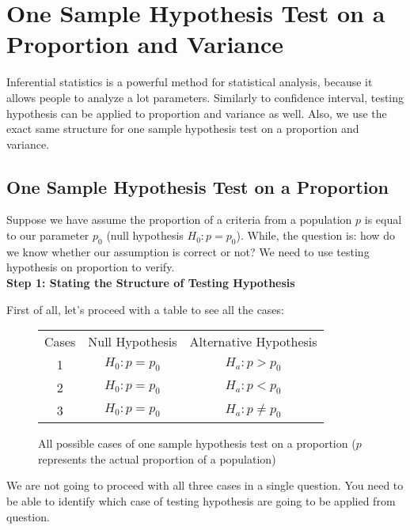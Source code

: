 \setcounter{chapter}{11}
\chapter{One Sample Hypothesis Test on a Proportion and Variance}

Inferential statistics is a powerful method for statistical analysis, because it allows people to analyze a lot parameters. Similarly to confidence interval, testing hypothesis can be applied to proportion and variance as well. Also, we use the exact same structure for one sample hypothesis test on a proportion and variance.

\section{One Sample Hypothesis Test on a Proportion}

Suppose we have assume the proportion of a criteria from a population $p$ is equal to our parameter $p_0$ (null hypothesis $H_0: p = p_0$). While, the question is: how do we know whether our assumption is correct or not? We need to use testing hypothesis on proportion to verify. \\

\textbf{Step 1: Stating the Structure of Testing Hypothesis}

First of all, let's proceed with a table to see all the cases:

\begin{center}
\begin{figure}[H]
\centering
\begin{tabular}{ c c c }
Cases & Null Hypothesis & Alternative Hypothesis \\
     1	   & $H_0: p = p_0$ & $H_a: p > p_0$ \\
     2	   & $H_0: p = p_0$ & $H_a: p < p_0$ \\
     3    & $H_0: p = p_0$ & $H_a: p \neq p_0$ \\
\end{tabular}
\caption{All possible cases of one sample hypothesis test on a proportion ($p$ represents the actual proportion of a population)}
\end{figure}
\end{center}
\vspace{-0.75cm}
We are not going to proceed with all three cases in a single question. You need to be able to identify which case of testing hypothesis are going to be applied from question.\\

